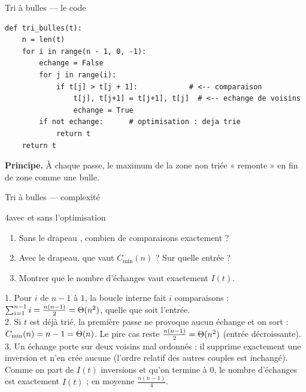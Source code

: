 \documentclass[11pt,aspectratio=169]{beamer}
\begin{document}
\begin{frame}[fragile]{Tri à bulles --- le code}
\begin{lstlisting}
def tri_bulles(t):
    n = len(t)
    for i in range(n - 1, 0, -1):
        echange = False
        for j in range(i):
            if t[j] > t[j + 1]:            # <-- comparaison
                t[j], t[j+1] = t[j+1], t[j]  # <-- echange de voisins
                echange = True
        if not echange:      # optimisation : deja trie
            return t
    return t
\end{lstlisting}
\begin{encadre}\small
\textbf{Principe.} À chaque passe, le maximum de la zone non triée « remonte » en fin de
zone comme une bulle.
\end{encadre}
\end{frame}

\begin{frame}{Tri à bulles --- complexité}
\begin{exercice}{4}{avec et sans l'optimisation}
\begin{enumerate}\setlength\itemsep{1pt}
  \item Sans le drapeau , combien de comparaisons exactement ?
  \item Avec le drapeau, que vaut $C_{\min}(n)$ ? Sur quelle entrée ?
  \item Montrer que le nombre d'échanges vaut exactement $I(t)$.
\end{enumerate}
\end{exercice}
\pause
\begin{soluce}
\small
1. Pour $i$ de $n-1$ à $1$, la boucle interne fait $i$ comparaisons :
$\sum_{i=1}^{n-1} i=\frac{n(n-1)}2=\Theta(n^2)$, quelle que soit l'entrée.\\[2pt]
2. Si $t$ est déjà trié, la première passe ne provoque aucun échange et on sort :
$C_{\min}(n)=n-1=\Theta(n)$. Le pire cas reste $\frac{n(n-1)}2=\Theta(n^2)$
(entrée décroissante).\\[2pt]
3. Un échange porte sur deux voisins mal ordonnés : il supprime exactement une inversion
et n'en crée aucune (l'ordre relatif des autres couples est inchangé). Comme on part de
$I(t)$ inversions et qu'on termine à $0$, le nombre d'échanges est exactement $I(t)$ ;
en moyenne $\frac{n(n-1)}4$.
\end{soluce}
\end{frame}
\end{document}
